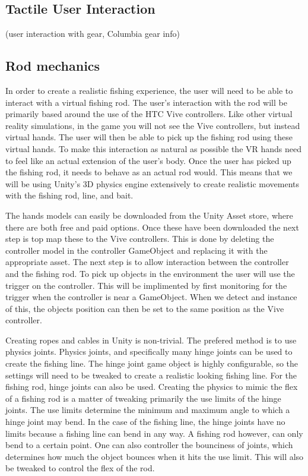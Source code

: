 \documentclass[10pt,journal,compsoc,onecolumn, draftclsnofoot]{IEEEtran}
\begin{document}
\subsection{Tactile User Interaction}
(user interaction with gear, Columbia gear info)

\subsection{Rod mechanics}
In order to create a realistic fishing experience, the user will need to be able to interact with a virtual fishing rod.
The user's interaction with the rod will be primarily based around the use of the HTC Vive controllers.
Like other virtual reality simulations, in the game you will not see the Vive controllers, but instead virtual hands.
The user will then be able to pick up the fishing rod using these virtual hands.
To make this interaction as natural as possible the VR hands need to feel like an actual extension of the user's body.
Once the user has picked up the fishing rod, it needs to behave as an actual rod would.
This means that we will be using Unity's 3D physics engine extensively to create realistic movements with the fishing rod, line, and bait.

The hands models can easily be downloaded from the Unity Asset store, where there are both free and paid options.
Once these have been downloaded the next step is top map these to the Vive controllers.
This is done by deleting the controller model in the controller GameObject and replacing it with the appropriate asset.
The next step is to allow interaction between the controller and the fishing rod.
To pick up objects in the environment the user will use the trigger on the controller.
This will be implimented by first monitoring for the trigger when the controller is near a GameObject.
When we detect and instance of this, the objects position can then be set to the same position as the Vive controller.

Creating ropes and cables in Unity is non-trivial.
The prefered method is to use physics joints.
Physics joints, and specifically many hinge joints can be used to create the fishing line.
The hinge joint game object is highly configurable, so the settings will need to be tweaked to create a realistic looking fishing line.
For the fishing rod, hinge joints can also be used.
Creating the physics to mimic the flex of a fishing rod is a matter of tweaking primarily the use limits of the hinge joints.
The use limits determine the minimum and maximum angle to which a hinge joint may bend.
In the case of the fishing line, the hinge joints have no limits because a fishing line can bend in any way.
A fishing rod however, can only bend to a certain point.
One can also controller the bounciness of joints, which determines how much the object bounces when it hits the use limit.
This will also be tweaked to control the flex of the rod. 

% 
% 
\end{document}
